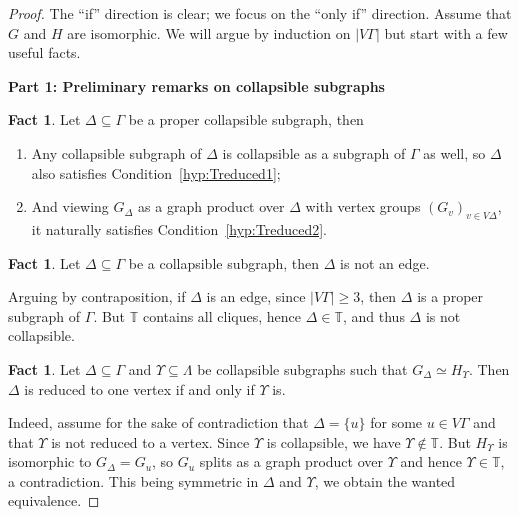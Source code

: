 \documentclass[a4paper,english,11pt]{article}
\theoremstyle{definition}
\newtheorem{Fact}[de]{Fact}
\theoremstyle{remark}
\begin{document}
\begin{proof}
The “if” direction is clear; we focus on the “only if” direction. Assume that $G$ and $H$ are isomorphic. We will argue by induction on $|V\Gamma|$ but start with a few useful facts.

\begin{center}
    \textbf{Part 1: Preliminary remarks on collapsible subgraphs}
\end{center}

\begin{Fact}\label{Fact:Stability}
Let $\Delta\subseteq \Gamma$ be a proper collapsible subgraph, then 
\begin{enumerate}
    \item Any collapsible subgraph of $\Delta$ is collapsible as a subgraph of $\Gamma$ as well, so $\Delta$ also satisfies Condition~\ref{hyp:Treduced1};
    \item And viewing $G_\Delta$ as a graph product over $\Delta$ with vertex groups $(G_v)_{v\in V\Delta}$, it naturally satisfies Condition~\ref{hyp:Treduced2}.
\end{enumerate}
\end{Fact}

\begin{Fact}\label{Fact:ecrasable-pas-arete}
    Let $\Delta\subseteq \Gamma$ be a collapsible subgraph, then $\Delta$ is not an edge.
\end{Fact}
Arguing by contraposition, if $\Delta$ is an edge, since $|V\Gamma|\geq 3$, then $\Delta$ is a proper subgraph of $\Gamma$. But $\mathbb{T}$ contains all cliques, hence $\Delta\in\mathbb{T}$, and thus $\Delta$ is not collapsible.

\begin{Fact}\label{Fact:Cas-un-sommet} Let $\Delta\subseteq \Gamma$ and $\Upsilon\subseteq \Lambda$ be collapsible subgraphs such that $G_\Delta \simeq H_\Upsilon$. Then $\Delta$ is reduced to one vertex if and only if $\Upsilon$ is. 
\end{Fact}
Indeed, assume for the sake of contradiction that $\Delta=\{u\}$ for some $u\in V\Gamma$ and that $\Upsilon$ is not reduced to a vertex. Since $\Upsilon$ is collapsible, we have $\Upsilon \notin \mathbb{T}$. But $H_{\Upsilon}$ is isomorphic to $G_\Delta=G_u$, so $G_u$ splits as a graph product over $\Upsilon$ and hence $\Upsilon\in \mathbb{T}$, a contradiction. This being symmetric in $\Delta$ and $\Upsilon$, we obtain the wanted equivalence.


\end{proof}
\end{document}
